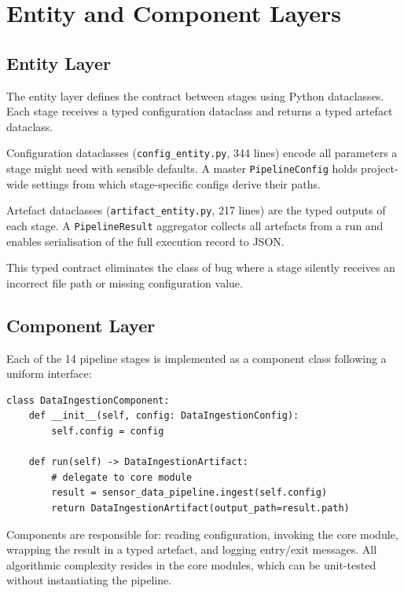 \section{Entity and Component Layers}
\label{sec:entity_component}

\subsection{Entity Layer}

The entity layer defines the contract between stages using Python dataclasses.
Each stage receives a typed configuration dataclass and returns a typed
artefact dataclass.

Configuration dataclasses (\texttt{config\_entity.py}, 344 lines) encode
all parameters a stage might need with sensible defaults.
A master \texttt{PipelineConfig} holds project-wide settings from which
stage-specific configs derive their paths.

Artefact dataclasses (\texttt{artifact\_entity.py}, 217 lines) are the typed
outputs of each stage.
A \texttt{PipelineResult} aggregator collects all artefacts from a run and
enables serialisation of the full execution record to JSON.

This typed contract eliminates the class of bug where a stage silently receives
an incorrect file path or missing configuration value.

\subsection{Component Layer}

Each of the 14 pipeline stages is implemented as a component class following
a uniform interface:

\begin{lstlisting}[caption={Component interface pattern.},
                   label={lst:component}]
class DataIngestionComponent:
    def __init__(self, config: DataIngestionConfig):
        self.config = config

    def run(self) -> DataIngestionArtifact:
        # delegate to core module
        result = sensor_data_pipeline.ingest(self.config)
        return DataIngestionArtifact(output_path=result.path)
\end{lstlisting}

Components are responsible for: reading configuration, invoking the core
module, wrapping the result in a typed artefact, and logging entry/exit
messages.
All algorithmic complexity resides in the core modules, which can be unit-tested
without instantiating the pipeline.

